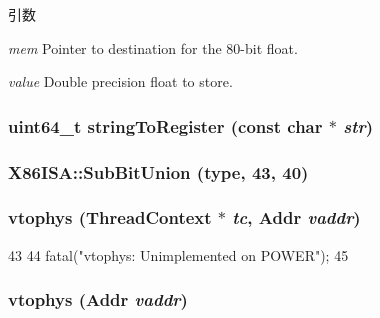 \begin{DoxyParams}{引数}
\item[{\em mem}]Pointer to destination for the 80-\/bit float. \item[{\em value}]Double precision float to store. \end{DoxyParams}
\hypertarget{namespaceX86ISA_a50d9573eb56ab6412eb6b6bbba31f440}{
\subsubsection[{stringToRegister}]{\setlength{\rightskip}{0pt plus 5cm}uint64\_\-t stringToRegister (const char $\ast$ {\em str})}}
\label{namespaceX86ISA_a50d9573eb56ab6412eb6b6bbba31f440}
\hypertarget{namespaceX86ISA_a6eaf5d1fcd0ae9c78d54d6ecdf97b4b5}{
\subsubsection[{SubBitUnion}]{\setlength{\rightskip}{0pt plus 5cm}X86ISA::SubBitUnion (type, \/  43, \/  40)}}
\label{namespaceX86ISA_a6eaf5d1fcd0ae9c78d54d6ecdf97b4b5}
\hypertarget{namespaceX86ISA_ad4bbbca3210dee66152520984c3aac6a}{
\subsubsection[{vtophys}]{ vtophys ({\bf ThreadContext} $\ast$ {\em tc}, \/  {\bf Addr} {\em vaddr})}}
\label{namespaceX86ISA_ad4bbbca3210dee66152520984c3aac6a}



\begin{DoxyCode}
43 {
44     fatal("vtophys: Unimplemented on POWER\n");
45 }
\end{DoxyCode}
\hypertarget{namespaceX86ISA_a3828815371ad2b0a1be60abdcb405cf9}{
\subsubsection[{vtophys}]{ vtophys ({\bf Addr} {\em vaddr})}}
\label{namespaceX86ISA_a3828815371ad2b0a1be60abdcb405cf9}



